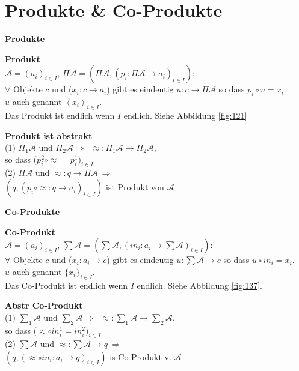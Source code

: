 \section{Produkte \& Co-Produkte}

\begin{multicols}{2}

\textbf{\underline{Produkte}} 

\textbf{ Produkt} \\
$\mathcal{A}=\left(a_{i}\right)_{i\in I}$, 
$\Pi\mathcal{A}=\left(\Pi\mathcal{A},\left(p_{i}:\Pi\mathcal{A}\rightarrow a_{i}\right)_{i\in I}\right)$: \\
$\forall$ Objekte $c$ und ($x_i : c \rightarrow a_i$) gibt es eindeutig $u: c \rightarrow \Pi \mathcal{A}$
so dass $p_i \circ u = x_i$. \\ $u$ auch genannt $\left\langle x_{i}\right\rangle _{i\in I}$.\\ Das Produkt ist endlich wenn $I$ endlich. 
Siehe Abbildung \ref{fig:121}

\textbf{ Produkt ist abstrakt} \\
(1) $\Pi_1 \mathcal{A}$ und $ \Pi_2 \mathcal{A} \Rightarrow \, \, \, \approx: \Pi_1\mathcal{A} \rightarrow \Pi_2\mathcal{A}$, \\ so dass ($p^2_i \circ \approx = p^1_i)_{i\in I}$ \\
(2) $\Pi \mathcal{A}$ und $ \approx : q \rightarrow \Pi \mathcal{A} \, \Rightarrow$\\$ (q, (p_i \circ \approx : q \rightarrow a_i)_{i \in I})$ ist Produkt von $\mathcal{A}$ 


\columnbreak

\textbf{\underline{Co-Produkte}} 

\textbf{ Co-Produkt} \\
$\mathcal{A}=\left(a_{i}\right)_{i\in I}$, 
$\sum\mathcal{A}=\left(\sum\mathcal{A}, \left(in_{i}:a_i \rightarrow \sum\mathcal{A} \right)_{i\in I}\right)$: \\
$\forall$ Objekte $c$ und ($x_i : a_i \rightarrow c$) gibt es eindeutig $u: \sum \mathcal{A} \rightarrow c$
so dass $u \circ in_i = x_i$. \\ $u$ auch genannt $\{ x_{i} \} _{i\in I}$.\\ Das Co-Produkt ist endlich wenn $I$ endlich. 
Siehe Abbildung \ref{fig:137}.

\textbf{ Abstr Co-Produkt} \\
(1) $\sum_1 \mathcal{A} $ und $ \sum_2 \mathcal{A} \Rightarrow \, \, \, \approx: \sum_1\mathcal{A} \rightarrow \sum_2\mathcal{A}$, \\ so dass ($\approx \circ in^1_i = in^2_i)_{i\in I}$ \\
(2) $\sum \mathcal{A} $ und $ \approx : \sum \mathcal{A} \rightarrow q \, \Rightarrow$\\$ (q, ( \approx \circ in_i : a_i \rightarrow q)_{i \in I})$ is Co-Produkt v. $\mathcal{A}$ 


\end{multicols}

